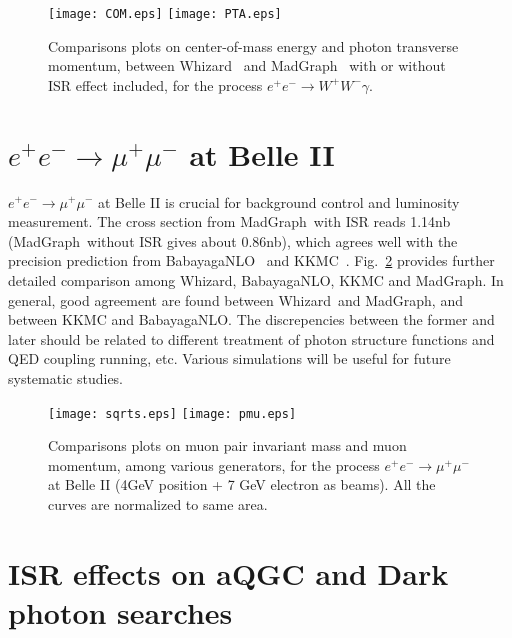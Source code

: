 \documentclass[a4paper,11pt]{article}
\newcommand{\whizard}{{\sc Whizard}}
\newcommand{\madgraph}{{\sc MadGraph}}
\begin{document}
\begin{figure}[!t]
  \centering
  \texttt{[image: COM.eps]}
  \texttt{[image: PTA.eps]}
  \caption{\label{fig:isr} Comparisons plots on center-of-mass energy and photon transverse momentum,  between \whizard~ and \madgraph~ with or without ISR effect included, for the process $e^+e^- \rightarrow W^+W^- \gamma$.}
\end{figure}



\section{$e^+e^- \rightarrow \mu^+\mu^-$ at Belle II}
\label{isrmg}
\qquad $e^+e^- \rightarrow \mu^+\mu^-$ at Belle II is crucial for background control and luminosity measurement. The cross section from \madgraph~with ISR reads 1.14nb (\madgraph~without ISR gives about 0.86nb), which agrees well with the precision prediction from BabayagaNLO~\cite{babayaganlo} and KKMC~\cite{kkmc}. Fig.~\ref{fig:isr2} provides further detailed comparison among \whizard, BabayagaNLO, KKMC and \madgraph. In general, good agreement are found between \whizard~and \madgraph, and between KKMC and BabayagaNLO. The discrepencies between the former and later should be related to different treatment of photon structure functions and QED coupling running, etc. Various simulations will be useful for future systematic studies.

\begin{figure}[!t]
  \centering
  \texttt{[image: sqrts.eps]}
  \texttt{[image: pmu.eps]}
  \caption{\label{fig:isr2} Comparisons plots on muon pair invariant mass and muon momentum, among various generators, for the process $e^+e^- \rightarrow \mu^+\mu^-$ at Belle II (4GeV position + 7 GeV electron as beams). All the curves are normalized to same area. }
\end{figure}
\section{ISR effects on aQGC and Dark photon searches}
\label{results}
\end{document}
